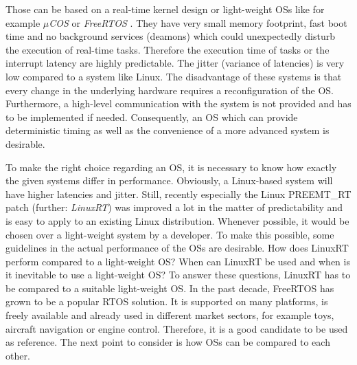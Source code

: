 Those can be based on a real-time kernel design or light-weight \acp{OS} like for example \textit{$\mu$COS} \cite{micrium:microcos} or \textit{FreeRTOS} \cite{freertos}.
They have very small memory footprint, fast boot time and no background services (deamons) which could unexpectedly disturb the execution of real-time tasks. 
Therefore the execution time of tasks or the interrupt latency are highly predictable.
The jitter (variance of latencies) is very low compared to a system like Linux. 
The disadvantage of these systems is that every change in the underlying hardware requires a reconfiguration of the \ac{OS}.
Furthermore, a high-level communication with the system is not provided and has to be implemented if needed.  
Consequently, an \ac{OS} which can provide deterministic timing as well as the convenience of a more advanced system is desirable.  
\par
To make the right choice regarding an \ac{OS}, it is necessary to know how exactly the given systems differ in performance. 
Obviously, a Linux-based system will have higher latencies and jitter. 
Still, recently especially the Linux PREEMT\_RT patch (further: \textit{LinuxRT}) was improved a lot in the matter of predictability and is easy to apply to an existing Linux distribution. 
Whenever possible, it would be chosen over a light-weight system by a developer. 
To make this possible, some guidelines in the actual performance of the \acp{OS} are desirable. 
How does LinuxRT perform compared to a light-weight \ac{OS}?
When can LinuxRT be used and when is it inevitable to use a light-weight \ac{OS}?
To answer these questions, LinuxRT has to be compared to a suitable light-weight \ac{OS}. 
In the past decade, FreeRTOS has grown to be a popular \ac{RTOS} solution.
It is supported on many platforms, is freely available and already used in different market sectors, for example toys, aircraft navigation or engine control. 
Therefore, it is a good candidate to be used as reference.  
The next point to consider is how \acp{OS} can be compared to each other.
 
